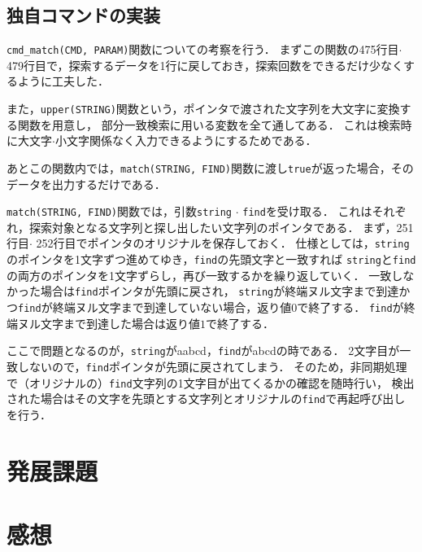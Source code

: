 \documentclass[autodetect-engine,dvi=dvipdfmx,ja=standard,
               a4j,11pt]{bxjsarticle}
\begin{document}
\subsection{独自コマンドの実装}

\verb|cmd_match(CMD, PARAM)|関数についての考察を行う．
まずこの関数の475行目$\cdot$ 479行目で，探索するデータを1行に戻しておき，探索回数をできるだけ少なくするように工夫した．

また，\verb|upper(STRING)|関数という，ポインタで渡された文字列を大文字に変換する関数を用意し，
部分一致検索に用いる変数を全て通してある．
これは検索時に大文字$\cdot$小文字関係なく入力できるようにするためである．

あとこの関数内では，\verb|match(STRING, FIND)|関数に渡し\verb|true|が返った場合，そのデータを出力するだけである．

\verb|match(STRING, FIND)|関数では，引数\verb|string| $\cdot$ \verb|find|を受け取る．
これはそれぞれ，探索対象となる文字列と探し出したい文字列のポインタである．
まず，251行目$\cdot$ 252行目でポインタのオリジナルを保存しておく．
仕様としては，\verb|string|のポインタを1文字ずつ進めてゆき，\verb|find|の先頭文字と一致すれば
\verb|string|と\verb|find|の両方のポインタを1文字ずらし，再び一致するかを繰り返していく．
一致しなかった場合は\verb|find|ポインタが先頭に戻され，
\verb|string|が終端ヌル文字まで到達かつ\verb|find|が終端ヌル文字まで到達していない場合，返り値$0$で終了する．
\verb|find|が終端ヌル文字まで到達した場合は返り値$1$で終了する．

ここで問題となるのが，\verb|string|がaabcd，\verb|find|がabcdの時である．
2文字目が一致しないので，\verb|find|ポインタが先頭に戻されてしまう．
そのため，非同期処理で（オリジナルの）\verb|find|文字列の1文字目が出てくるかの確認を随時行い，
検出された場合はその文字を先頭とする文字列とオリジナルの\verb|find|で再起呼び出しを行う．


\section{発展課題} \label{sec:6}


\section{感想} \label{sec:7}
\end{document}
